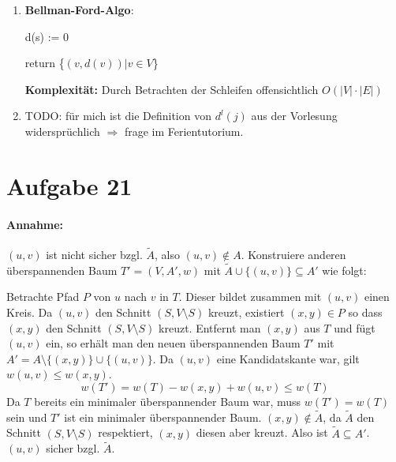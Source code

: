 \documentclass[10pt,a4paper]{article}
\begin{document}
    \begin{enumerate}[label={\alph*)}]
        \item 

            \textbf{Bellman-Ford-Algo}: \\
            \begin{algorithm}[H]
            d(s) := 0 \;
            
            return \{$(v,d(v)) | v \in V$\} \;
            \end{algorithm}
            
            \textbf{Komplexität:} Durch Betrachten der Schleifen offensichtlich  $O(|V| \cdot |E|)$            
            
        \item
            TODO: für mich ist die Definition von $d^l(j)$ aus der Vorlesung widersprüchlich
                $\Rightarrow $ frage im Ferientutorium.
            

    \end{enumerate}
    

\section*{Aufgabe 21}
	\paragraph{Annahme:} $(u,v)$ ist nicht sicher bzgl. $\tilde{A}$, also $(u, v) \notin A$.
	Konstruiere anderen überspannenden Baum $T' = (V, A', w)$ mit $\tilde{A} \cup \{(u,v)\} \subseteq A'$ wie folgt:

	Betrachte Pfad $P$ von $u$ nach $v$ in $T$. Dieser bildet zusammen mit $(u, v)$ einen Kreis.
	Da $(u,v)$ den Schnitt $(S, V \setminus S)$ kreuzt, existiert $(x, y) \in P$ so dass $(x, y)$ den Schnitt $(S, V \setminus S)$ kreuzt.
	Entfernt man $(x,y)$ aus $T$ und fügt $(u,v)$ ein, so erhält man den neuen überspannenden Baum $T'$
	mit $A' = A \setminus \{(x, y)\} \cup \{(u, v)\}$.
	Da $(u, v)$ eine Kandidatskante war, gilt $w(u,v) \leq w(x, y)$.
	\begin{equation*}
	w(T') = w(T) - w(x, y) + w(u,v) \leq w(T)
	\end{equation*}
	Da $T$ bereits ein minimaler überspannender Baum war, muss $w(T') = w(T)$ sein und $T'$ ist ein minimaler überspannender Baum.
	$(x, y) \notin \tilde{A}$, da $\tilde{A}$ den Schnitt $(S, V \setminus S)$ respektiert, $(x, y)$ diesen aber kreuzt.
	Also ist $\tilde{A} \subseteq A'$. $(u, v)$ sicher bzgl. $\tilde{A}$.
\end{document}
